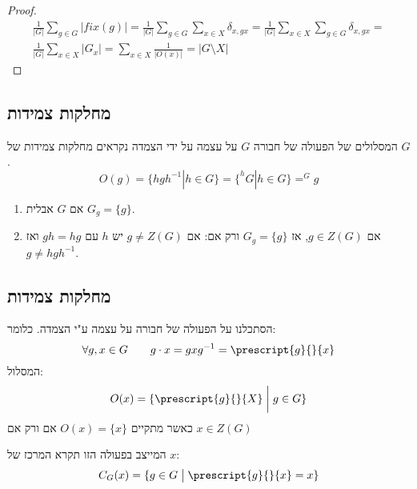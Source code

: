 \documentclass{tstextbook}
\begin{document}
\begin{proof}
$$\begin{gather}\frac{1}{|G|}\sum_{g\in G}|fix(g)|=\frac{1}{|G|} \sum_{g \in  G}\sum_{x \in  X}\delta_{x,gx}=\frac{1}{|G|}\sum_{x \in  X}\sum_{g \in  G}\delta_{x,gx}= \\\frac{1}{|G|}\sum_{x \in X}|G_{x}|=\sum_{x \in X} \frac{1}{|O(x)|}=|G\setminus X|
\end{gather}$$

\end{proof}
\subsection{מחלקות צמידות}

\begin{definition}
המסלולים של הפעולה של חבורה \(G\) על עצמה על ידי הצמדה נקראים מחלקות צמידות של \(G\).
$$O(g)=\{ hgh^{-1} |h\in G \}=\{  ^hG | h \in  G \}=  ^Gg$$

\end{definition}
\begin{example}
  \begin{enumerate}
    \item אם \(G\) אבלית \(G_{g}=\{ g \}\). 


    \item אם \(g\in Z(G)\), אז \(G_{g}=\{ g \}\) ורק אם: 
אם \(g\neq Z(G)\) יש \(h\) עם \(gh=hg\) ואז \(g\neq hgh^{-1}\).


  \end{enumerate}
\end{example}
\subsection{מחלקות צמידות}

הסתכלנו על הפעולה של חבורה על עצמה ע"י הצמדה. כלומר:
$$\forall g,x \in G\qquad g\cdot x=gxg^{-1} = \prescript{g}{}{x}$$
המסלול:
$$O(x)=\{ \prescript{g}{}{X}\;\bigg|\;g\in G \}$$
כאשר מתקיים \(O(x)=\{ x \}\) אם ורק אם \(x \in Z(G)\)

המייצב בפעולה הזו תקרא המרכז של \(x\):
$$C_{G}(x)=\{ g\in G\;\big|\; \prescript{g}{}{x}=x \}$$
\end{document}
